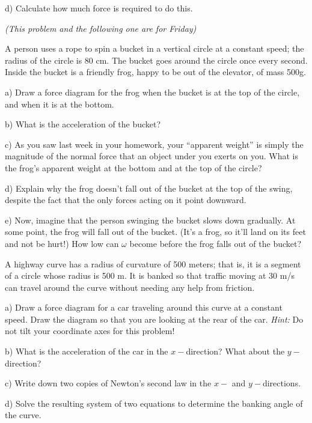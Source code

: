 \documentclass[12pt]{article}
\begin{document}
d) Calculate how much force is required to do this.


\newpage

\centerline{\it \small (This problem and the following one are for Friday)}

  A person uses a rope to spin a bucket in a vertical circle at a constant speed; the radius of the circle is 80 cm. The bucket goes around the circle once every second. Inside the bucket is a friendly frog, happy to be out of the elevator, of mass 500g.


a) Draw a force diagram for the frog when the bucket is at the top of the circle, and when it is at the bottom.

\vspace{2in}

b) What is the acceleration of the bucket?

\vspace{1in}


c) As you saw last week in your homework, your ``apparent weight'' is simply the magnitude of the normal force that an object under you exerts on you. What is the frog's apparent weight at the bottom and at the top of the circle?

\vspace{2in}
\newpage
d) Explain why the frog doesn't fall out of the bucket at the top of the swing, despite the fact that the only forces acting on it point downward.

\vspace{4in}

e) Now, imagine that the person swinging the bucket slows down gradually. At some point, the frog will fall out of the bucket. (It's a frog, so it'll land on its feet and not be hurt!) How low can $\omega$ become before the frog falls out of the bucket?

\newpage


A highway curve has a radius of curvature of 500 meters; that is, it is a segment of a circle whose radius is 500 m. It is banked so that traffic moving at 30 m/s can travel
  around the curve without needing any help from friction.


a) Draw a force diagram for a car traveling around this curve at a constant speed. Draw the diagram so that you are looking at the rear of the car. {\it Hint:} Do not tilt your coordinate axes for this problem!


\vspace{2in}

b) What is the acceleration of the car in the $x-$direction? What about the $y-$direction?

\vspace{1in}

c) Write down two copies of Newton's second law in the $x-$ and $y-$directions.

\vspace{1.5in}

d) Solve the resulting system of two equations to determine the banking angle of the curve.
\end{document}
